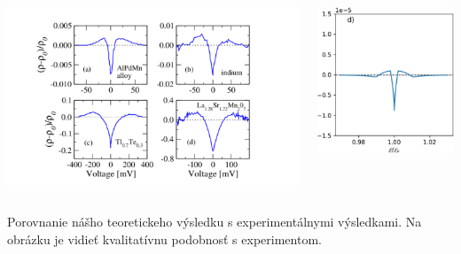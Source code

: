\documentclass[
	11pt, %
]{beamer}
\begin{document}
\begin{frame}
\begin{columns}[c]
\begin{column}{.5\textwidth}
\includegraphics[scale=0.35]{grafy/B2}
\end{column}
\begin{column}{.5\textwidth}
\qquad
\includegraphics[scale=0.35]{grafy/final}
\end{column}
\end{columns}
Porovnanie nášho teoretickeho výsledku s experimentálnymi výsledkami. Na obrázku je vidieť kvalitatívnu podobnosť s experimentom.
\end{frame}
\end{document}
